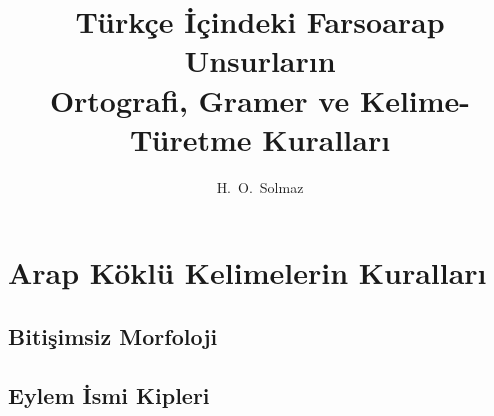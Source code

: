 \documentclass[a5paper,10pt, twoside]{scrbook}
\title{\Large Türkçe İçindeki Farsoarap Unsurların \\
  Ortografi, Gramer ve Kelime-Türetme Kuralları}
\author{H.\ O.\ Solmaz}
\date{}
\begin{document}
\maketitle
\tableofcontents





\chapter{Arap Köklü Kelimelerin Kuralları}
\section{Bitişimsiz Morfoloji}

\section{Eylem İsmi Kipleri}
\end{document}
